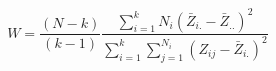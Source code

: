

\[
W = \frac{(N-k)} {(k-1)} \frac{\sum_{i=1}^{k}N_{i}(\bar{Z}_{i.}-\bar{Z}_{..})^{2} } {\sum_{i=1}^{k}\sum_{j=1}^{N_i}(Z_{ij}-\bar{Z}_{i.})^{2} }
\]


